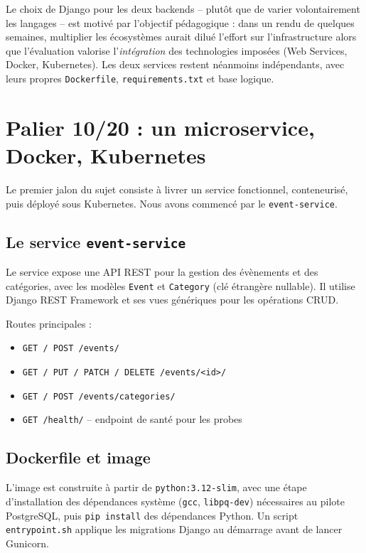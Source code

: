 \documentclass[11pt,a4paper]{article}
\newcommand{\code}[1]{\texttt{#1}}
\begin{document}
Le choix de Django pour les deux backends -- plutôt que de varier volontairement les langages -- est motivé par l'objectif pédagogique : dans un rendu de quelques semaines, multiplier les écosystèmes aurait dilué l'effort sur l'infrastructure alors que l'évaluation valorise l'\emph{intégration} des technologies imposées (Web Services, Docker, Kubernetes). Les deux services restent néanmoins indépendants, avec leurs propres \code{Dockerfile}, \code{requirements.txt} et base logique.

\section{Palier 10/20 : un microservice, Docker, Kubernetes}

Le premier jalon du sujet consiste à livrer un service fonctionnel, conteneurisé, puis déployé sous Kubernetes. Nous avons commencé par le \code{event-service}.

\subsection{Le service \code{event-service}}

Le service expose une API REST pour la gestion des évènements et des catégories, avec les modèles \code{Event} et \code{Category} (clé étrangère nullable). Il utilise Django REST Framework et ses vues génériques pour les opérations CRUD.

Routes principales :
\begin{itemize}
    \item \code{GET / POST /events/}
    \item \code{GET / PUT / PATCH / DELETE /events/<id>/}
    \item \code{GET / POST /events/categories/}
    \item \code{GET /health/} -- endpoint de santé pour les probes
\end{itemize}

\subsection{Dockerfile et image}

L'image est construite à partir de \code{python:3.12-slim}, avec une étape d'installation des dépendances système (\code{gcc}, \code{libpq-dev}) nécessaires au pilote PostgreSQL, puis \code{pip install} des dépendances Python. Un script \code{entrypoint.sh} applique les migrations Django au démarrage avant de lancer Gunicorn.
\end{document}
